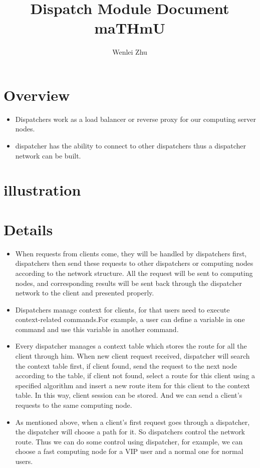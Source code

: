 \documentclass[10pt]{article}
\begin{document}
\title{Dispatch Module Document\\maTHmU }
\author{Wenlei Zhu}
\maketitle


\section{Overview}

\begin{itemize}
\item Dispatchers work as a load balancer or reverse proxy for our computing server nodes. 

\item dispatcher has the ability to connect to other dispatchers thus a dispatcher network can be built.
\end{itemize}

\section{illustration}

\section{Details}
\begin{itemize}
\item When requests from clients come, they will be handled by dispatchers first, dispatchers then send these requests to other dispatchers or computing nodes according to the network structure. All the request will be sent to computing nodes, and corresponding results will be sent back through the dispatcher network to the client and presented properly.

\item Dispatchers manage context for clients, for that users need to execute context-related commands.For example, a user can define a variable in one command and use this variable in another command.

\item Every dispatcher manages a context table which stores the route for all the client through him. When new client request received, dispatcher will search the context table first, if client found, send the request to the next node according to the table, if client not found, select a route for this client using a specified algorithm and insert a new route item for this client to the context table. In this way, client session can be stored. And we can send a client’s requests to the same computing node.

\item As mentioned above, when a client’s first request goes through a dispatcher, the dispatcher will choose a path for it. So dispatchers control the network route. Thus we can do some control using dispatcher, for example, we can choose a fast computing node for a VIP user and a normal one for normal users.
\end{itemize}
\end{document}
